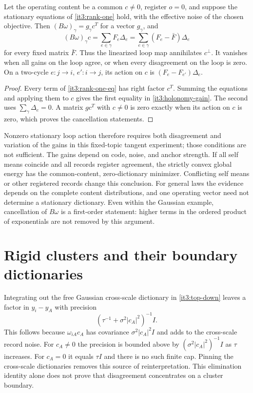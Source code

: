 \documentclass[11pt,letterpaper]{report}
\begin{document}
Let the operating content be a common $c\ne0$, register $o=0$, and suppose the stationary equations of \cref{it3:rank-one} hold, with the effective noise of the chosen objective. Then
$(B\omega)_\gamma=g_\gamma c^T$ for a vector $g_\gamma$, and
\begin{equation}
(B\omega)_\gamma c
=\sum_{e\in\gamma}F_e\Delta_e
=\sum_{e\in\gamma}(F_e-\bar F)\Delta_e
\label{it3:holonomy-gain}
\end{equation}
for every fixed matrix $\bar F$. Thus the linearized loop map annihilates $c^\perp$. It vanishes when all gains on the loop agree, or when every disagreement on the loop is zero. On a two-cycle $e:j\to i$, $e':i\to j$, its action on $c$ is $(F_e-F_{e'})\Delta_e$.
\begin{proof}
Every term of \cref{it3:rank-one-eq} has right factor $c^T$. Summing the equations and applying them to $c$ gives the first equality in \cref{it3:holonomy-gain}. The second uses $\sum_\gamma\Delta_e=0$. A matrix $gc^T$ with $c\ne0$ is zero exactly when its action on $c$ is zero, which proves the cancellation statements.
\end{proof}

Nonzero stationary loop action therefore requires both disagreement and variation of the gains in this fixed-topic tangent experiment; those conditions are not sufficient. The gains depend on code, noise, and anchor strength. If all self means coincide and all records register agreement, the strictly convex global energy has the common-content, zero-dictionary minimizer. Conflicting self means or other registered records change this conclusion. For general laws the evidence depends on the complete content distributions, and one operating vector need not determine a stationary dictionary. Even within the Gaussian example, cancellation of $B\omega$ is a first-order statement: higher terms in the ordered product of exponentials are not removed by this argument.

\chapter{Rigid clusters and their boundary dictionaries}
\label{it3:ch-hierarchy}

Integrating out the free Gaussian cross-scale dictionary in \cref{it3:top-down} leaves a factor in $y_i-y_A$ with precision
\begin{equation}
(\tau^{-1}+\sigma^2|c_A|^2)^{-1}I.
\end{equation}
This follows because $\omega_{iA}c_A$ has covariance $\sigma^2|c_A|^2I$ and adds to the cross-scale record noise. For $c_A\ne0$ the precision is bounded above by $(\sigma^2|c_A|^2)^{-1}I$ as $\tau$ increases. For $c_A=0$ it equals $\tau I$ and there is no such finite cap. Pinning the cross-scale dictionaries removes this source of reinterpretation. This elimination identity alone does not prove that disagreement concentrates on a cluster boundary.
\end{document}
